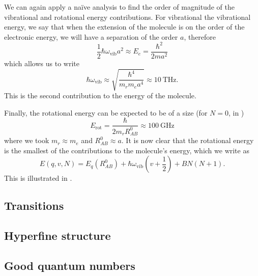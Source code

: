 We can again apply a na\"ive analysis to find the order of magnitude of the
vibrational and rotational energy contributions. For vibrational the
vibrational energy, we say that when the extension of the molecule is on the
order of the electronic energy, we will have a separation of the order $a$,
therefore
%
\begin{equation}
  \frac{1}{2}\hbar\omega_\text{vib}a^2 \approx E_e = \frac{\hbar^2}{2ma^2}
\end{equation}
%
which allows us to write
%
\begin{equation}
  \hbar\omega_\text{vib} \approx \sqrt{\frac{\hbar^4}{m_r m_e a^4}} \approx
    \SI{10}{\tera\hertz}.
\end{equation}
%
This is the second contribution to the energy of the molecule.

Finally, the rotational energy can be expected to be of a size (for $N=0$, in
)
%
\begin{equation}
  E_\text{rot} = \frac{\hbar}{2 m_r R^0_{AB}} \approx \SI{100}{\giga\hertz}
\end{equation}
%
where we took $m_r\approx m_e$ and $R^0_{AB}\approx a$. It is now clear that the
rotational energy is the smallest of the contributions to the molecule's
energy, which we write as
%
\begin{equation}
  E(q, v, N) = E_q(R^0_{AB}) + \hbar\omega_\text{vib}\left(v +
    \frac{1}{2}\right) + B N(N+1).
\end{equation}
%
This is illustrated in .

\subsection{Transitions}


\subsection{Hyperfine structure}


\subsection{Good quantum numbers}

